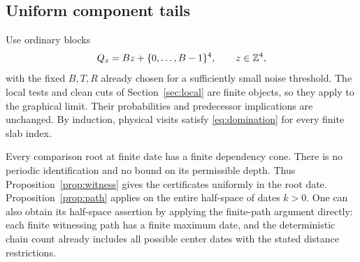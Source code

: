 \subsection{Uniform component tails}

Use ordinary blocks
\[
 Q_z=Bz+\{0,\ldots,B-1\}^4,\qquad z\in\mathbb Z^4,
\]
with the fixed \(B,T,R\) already chosen for a sufficiently small
noise threshold. The local tests and clean cuts of
Section~\ref{sec:local} are finite objects, so they apply to the
graphical limit. Their probabilities and predecessor implications
are unchanged. By induction, physical visits satisfy
\eqref{eq:domination} for every finite slab index.

Every comparison root at finite date has a finite dependency cone.
There is no periodic identification and no bound on its permissible
depth. Thus Proposition~\ref{prop:witness} gives the certificates
uniformly in the root date. Proposition~\ref{prop:path} applies on
the entire half-space of dates \(k>0\). One can also obtain its
half-space assertion by applying the finite-path argument directly:
each finite witnessing path has a finite maximum date, and the
deterministic chain count already includes all possible center
dates with the stated distance restrictions.

